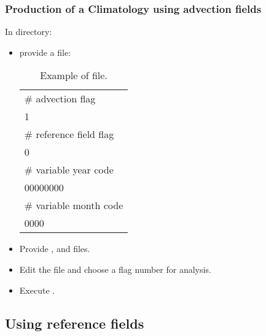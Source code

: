 \begin{frame}
\frametitle{Production of a Climatology using advection fields} 

\centerline{In  directory:}

\begin{itemize}
\item provide a  file:
\begin{table}
\centering
\caption{Example of  file.}

\small{
\begin{tabular}{|l|}
\hline
\# advection flag\\
1\\
\# reference field flag\\
0\\
\# variable year code \\
00000000\\
\# variable month code\\
0000\\
\hline
\end{tabular}
}
\end{table}
\item Provide ,  and  files.
\item Edit the  file and choose a flag number for analysis.
\item Execute .
\end{itemize}


\end{frame}
\subsection{Using reference fields}


